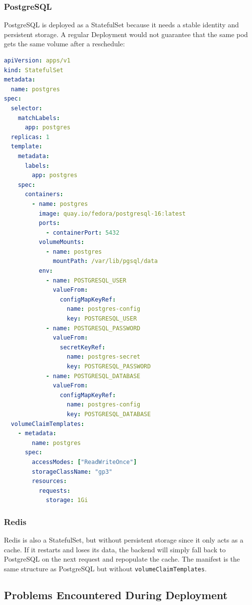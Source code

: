 \subsubsection{PostgreSQL}

PostgreSQL is deployed as a StatefulSet because it needs a stable identity and persistent
storage. A regular Deployment would not guarantee that the same pod gets the same volume
after a reschedule:

\begin{lstlisting}[language=yaml]
apiVersion: apps/v1
kind: StatefulSet
metadata:
  name: postgres
spec:
  selector:
    matchLabels:
      app: postgres
  replicas: 1
  template:
    metadata:
      labels:
        app: postgres
    spec:
      containers:
        - name: postgres
          image: quay.io/fedora/postgresql-16:latest
          ports:
            - containerPort: 5432
          volumeMounts:
            - name: postgres
              mountPath: /var/lib/pgsql/data
          env:
            - name: POSTGRESQL_USER
              valueFrom:
                configMapKeyRef:
                  name: postgres-config
                  key: POSTGRESQL_USER
            - name: POSTGRESQL_PASSWORD
              valueFrom:
                secretKeyRef:
                  name: postgres-secret
                  key: POSTGRESQL_PASSWORD
            - name: POSTGRESQL_DATABASE
              valueFrom:
                configMapKeyRef:
                  name: postgres-config
                  key: POSTGRESQL_DATABASE
  volumeClaimTemplates:
    - metadata:
        name: postgres
      spec:
        accessModes: ["ReadWriteOnce"]
        storageClassName: "gp3"
        resources:
          requests:
            storage: 1Gi
\end{lstlisting}

\subsubsection{Redis}

Redis is also a StatefulSet, but without persistent storage since it only acts as a
cache. If it restarts and loses its data, the backend will simply fall back to PostgreSQL
on the next request and repopulate the cache. The manifest is the same structure as
PostgreSQL but without \texttt{volumeClaimTemplates}.

\subsection{Problems Encountered During Deployment}

